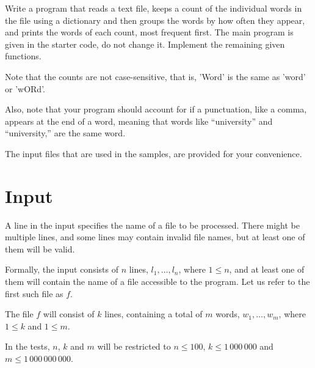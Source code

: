 
Write a program that reads a text file,
keeps a count of the individual words in the file using a dictionary
and then groups the words by how often they appear,
and prints the words of each count, most frequent first.
The main program is given in the starter code, do not change it.
Implement the remaining given functions.

Note that the counts are not case-sensitive, that is, 'Word' is the same as 'word' or 'wORd'.

Also, note that your program should account for if a punctuation, like a comma, appears at the end of a word,
meaning that words like ``university'' and ``university,'' are the same word.

The input files that are used in the samples,
are provided for your convenience.


\section*{Input}

A line in the input specifies the name of a file to be processed.
There might be multiple lines, and some lines may contain invalid file names,
but at least one of them will be valid.

Formally, the input consists of $n$ lines,
$l_1, \dots, l_n$, where $1 \le n$,
and at least one of them will contain the name of a file accessible to the program.
Let us refer to the first such file as $f$.

The file $f$ will consist of $k$ lines,
containing a total of $m$ words,
$w_1, \dots, w_m$,
where $1 \le k$ and $1 \le m$.

In the tests, $n$, $k$ and $m$ will be restricted to
$n \le 100$, $k \le 1\,000\,000$ and $m \le 1\,000\,000\,000$.


